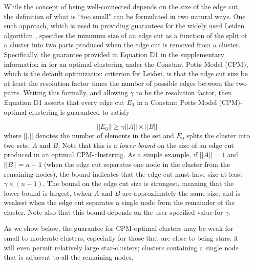 \documentclass[11pt]{article}   	%
\begin{document}
While the concept of being well-connected depends on the size of the edge cut, the definition of what is ``too small" can be formulated in two natural ways. One such  approach, which is used in
providing guarantees for the widely used Leiden algorithm \citep{Traag_2019}, specifies the minimum size of an edge cut as a function of the split  of a cluster into two parts produced
when the edge cut is removed from a cluster. Specifically, the guarantee provided   in Equation D1 in the supplementary information in \cite{Traag_2019} for an optimal clustering under the Constant Potts Model (CPM), which is the default optimization criterion for Leiden, is that the edge cut size be at least the resolution factor   times the number of possible edges between the two  parts. Writing this formally, and allowing $\gamma$ to be the resolution factor, then Equation D1 asserts that every edge cut $E_0$ in a Constant Potts Model (CPM)-optimal clustering is guaranteed to satisfy

 \begin{equation}
 ||E_0|| \geq \gamma ||A|| \times ||B||
 \label{eqn:cpm-bound}
 \end{equation}
where $||.||$ denotes the number of elements in the set and $E_0$ splits the cluster into two sets, $A$ and $B$.
Note that this is a {\em lower bound} on the size of an edge cut produced in an optimal CPM-clustering.
As a simple example, if $||A||=1$ and $||B||=n-1$ (when the edge cut separates one node in the cluster from the remaining nodes),
 the bound indicates that the edge cut must have size at least $\gamma \times (n-1)$.
The bound on the edge cut size  is strongest, meaning that the lower bound is largest, twhen $A$ and $B$ are approximately the same size, and is weakest when the
edge cut separates a single node from the remainder of the cluster. Note also that this bound depends on  the user-specified value for $\gamma$.

As we show below, the guarantee for CPM-optimal clusters may be weak for small to moderate clusters, especially for those that are close to being stars; it will even permit relatively
large star-clusters; clusters containing a single node that is adjacent to all the remaining nodes.
\end{document}
